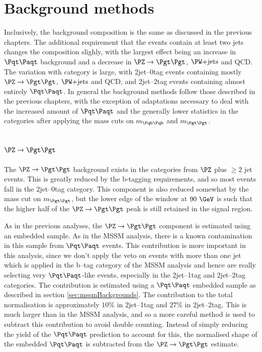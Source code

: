 \section{Background methods}
\label{sec:Hhhbackgrounds}

Inclusively, the background composition is the same as discussed in the previous
chapters. The additional requirement that the events contain at least two jets
changes the composition slighly, with the largest effect being an increase in
$\ttbar$ background and a decrease in $\ZToTauTau$, $\WJets$ and QCD. The
variation with category is large, with 2jet--0tag events containing mostly
$\ZToTauTau$, $\WJets$ and QCD, and 2jet--2tag events containing almost entirely
$\ttbar$. In general the background methods follow those described in the
previous chapters, with the exception of adaptations necessary to deal with the
increased amount of $\ttbar$ and the generally lower statistics in the
categories after applying the mass cuts on $m_{\Pqb\Pqb}$ and $m_{\Pgt\Pgt}$.

\subsection{$\ZToTauTau$}

The $\ZToTauTau$ background exists in the categories from $\PZ$ plus $\geq 2$
jet events. This is greatly reduced by the b-tagging requirements, and so most
events fall in the 2jet--0tag category. This component is also reduced somewhat
by the mass cut on $m_{\Pgt\Pgt}$, but the lower edge of the window at $90~\GeV$
is such that the higher half of the $\ZToTauTau$ peak is still retained in the
signal region.  

As in the previous analyses, the $\ZToTauTau$ component is estimated using an
embedded sample. As in the \ac{MSSM} analysis, there is a known contamination in
this sample from $\ttbar$ events. This contribution is more important in this
analysis, since we don't apply the veto on events with more than one jet which
is applied in the b--tag category of
the \ac{MSSM} analysis and hence are really selecting very $\ttbar$-like events,
especially in the 2jet--1tag and 2jet--2tag categories. The contribution is
estimated using a $\ttbar$ embedded sample as described in section
\ref{sec:mssmBackgrounds}. The contribution to the total normalisation is
approximately $10\%$ in 2jet--1tag and $27\%$ in 2jet--2tag. This is much larger
than in the \ac{MSSM} analysis, and so a more careful method is used to subtract
this contribution to avoid double counting. Instead of simply reducing the yield
of the $\ttbar$ prediction to account for this, the normalised shape of the
embedded $\ttbar$ is subtracted from the $\ZToTauTau$ estimate.

